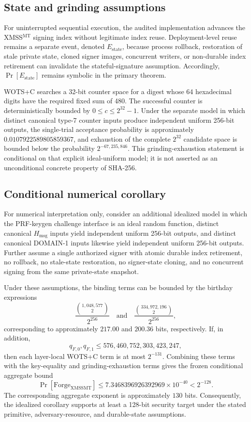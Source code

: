 \subsection{State and grinding assumptions}
\label{subsec:wotsc_state_grinding}

For uninterrupted sequential execution, the audited implementation advances
the XMSS$^{\mathrm{MT}}$ signing index without legitimate index reuse.
Deployment-level reuse remains a separate event, denoted
$E_{\mathrm{state}}$, because process rollback, restoration of stale private
state, cloned signer images, concurrent writers, or non-durable index
retirement can invalidate the stateful-signature assumption. Accordingly,
$\Pr[E_{\mathrm{state}}]$ remains symbolic in the primary theorem.

WOTS+C searches a 32-bit counter space for a digest whose 64 hexadecimal
digits have the required fixed sum of 480. The successful counter is
deterministically bounded by
$0\le c\le 2^{32}-1$. Under the separate model in which distinct canonical
type-7 counter inputs produce independent uniform 256-bit outputs, the
single-trial acceptance probability is approximately
$0.0107922589805859367$, and exhaustion of the complete $2^{32}$ candidate
space is bounded below the probability $2^{-67{,}235{,}846}$. This
grinding-exhaustion statement is conditional on that explicit ideal-uniform
model; it is not asserted as an unconditional concrete property of SHA-256.

\subsection{Conditional numerical corollary}
\label{subsec:wotsc_conditional_corollary}

For numerical interpretation only, consider an additional idealized model in
which the PRF-keygen challenge interface is an ideal random function,
distinct canonical $H_{\mathrm{msg}}$ inputs yield independent uniform
256-bit outputs, and distinct canonical DOMAIN-1 inputs likewise yield
independent uniform 256-bit outputs. Further assume a single authorized
signer with atomic durable index retirement, no rollback, no stale-state
restoration, no signer-state cloning, and no concurrent signing from the same
private-state snapshot.

Under these assumptions, the binding terms can be bounded by the birthday
expressions
\[
  \frac{\binom{1{,}048{,}577}{2}}{2^{256}}
  \quad\text{and}\quad
  \frac{\binom{334{,}972{,}196}{2}}{2^{256}},
\]
corresponding to approximately $217.00$ and $200.36$ bits, respectively.
If, in addition,
\[
 q_{F,0},q_{F,1}
 \le
 576{,}460{,}752{,}303{,}423{,}247,
\]
then each layer-local WOTS+C term is at most $2^{-131}$. Combining these
terms with the key-equality and grinding-exhaustion terms gives the frozen
conditional aggregate bound
\[
  \Pr[\mathrm{Forge}_{\mathrm{XMSSMT}}]
  \le
  7.3468396926392969\times 10^{-40}
  < 2^{-128}.
\]
The corresponding aggregate exponent is approximately $130$ bits.
Consequently, the idealized corollary supports at least a 128-bit security
target under the stated primitive, adversary-resource, and durable-state
assumptions.

